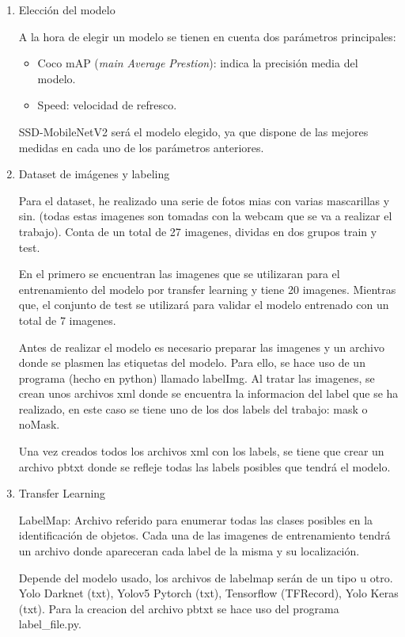 \begin{enumerate}
	\item Elección del modelo
	
	A la hora de elegir un modelo se tienen en cuenta dos parámetros principales: 
	
	\begin{itemize}
		\item Coco mAP (\textit{main Average Prestion}): indica la precisión media del modelo.
		\item Speed: velocidad de refresco.
	\end{itemize} 
	
	SSD-MobileNetV2 será el modelo elegido, ya que dispone de las mejores medidas en cada uno de los parámetros anteriores.
	
	\item Dataset de imágenes y labeling
	
	Para el dataset, he realizado una serie de fotos mias con varias mascarillas y sin. (todas estas imagenes son tomadas con la webcam que se va a realizar el trabajo). Conta de un total de 27 imagenes, dividas en dos grupos train y test.
	
	En el primero se encuentran las imagenes que se utilizaran para el entrenamiento del modelo por transfer learning y tiene 20 imagenes. Mientras que, el conjunto de test se utilizará para validar el modelo entrenado con un total de 7 imagenes.
	
	Antes de realizar el modelo es necesario preparar las imagenes y un archivo donde se plasmen las etiquetas del modelo. Para ello, se hace uso de un programa (hecho en python) llamado labelImg. Al tratar las imagenes, se crean unos archivos xml donde se encuentra la informacion del label que se ha realizado, en este caso se tiene uno de los dos labels del trabajo: mask o noMask.
	
	Una vez creados todos los archivos xml con los labels, se tiene que crear un archivo pbtxt donde se refleje todas las labels posibles que tendrá el modelo.
	
	\item Transfer Learning
	
	LabelMap: Archivo referido para enumerar todas las clases posibles en la identificación de objetos. Cada una de las imagenes de entrenamiento tendrá un archivo donde apareceran cada label de la misma y su localización. 
	
	Depende del modelo usado, los archivos de labelmap serán de un tipo u otro. Yolo Darknet (txt), Yolov5 Pytorch (txt), Tensorflow (TFRecord), Yolo Keras (txt). Para la creacion del archivo pbtxt se hace uso del programa label\_file.py.
	

\end{enumerate}

